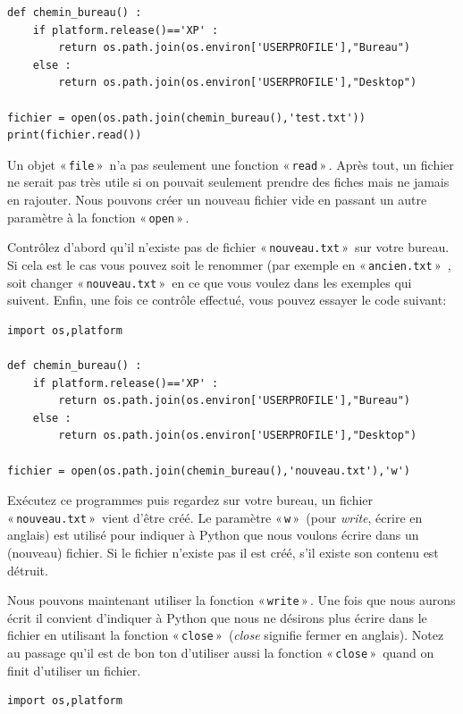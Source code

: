 \begin{MAC}
\begin{Verbatim}[frame=single,rulecolor=\color{gray}, label=ne pas saisir]
def chemin_bureau() :
    if platform.release()=='XP' :
        return os.path.join(os.environ['USERPROFILE'],"Bureau")
    else :
        return os.path.join(os.environ['USERPROFILE'],"Desktop")
    
fichier = open(os.path.join(chemin_bureau(),'test.txt'))
print(fichier.read())
\end{Verbatim}

Un objet « \texttt{file} »  n'a pas seulement une fonction « \texttt{read} » . Après tout, un fichier ne serait pas très utile si on pouvait seulement prendre des fiches mais ne jamais en rajouter. Nous pouvons créer un nouveau fichier vide en passant un autre paramètre à la fonction « \texttt{open} » .

Contrôlez d'abord qu'il n'existe pas de fichier « \texttt{nouveau.txt} »  sur votre bureau. Si cela est le cas vous pouvez soit le renommer (par exemple en « \texttt{ancien.txt} »  , soit changer « \texttt{nouveau.txt} »  en ce que vous voulez dans les exemples qui suivent. Enfin, une fois ce contrôle effectué, vous pouvez essayer le code suivant:

\begin{Verbatim}[frame=single,rulecolor=\color{mbleu}, label=à taper par exemple en reprenant l'existant]
import os,platform

def chemin_bureau() :
    if platform.release()=='XP' :
        return os.path.join(os.environ['USERPROFILE'],"Bureau")
    else :
        return os.path.join(os.environ['USERPROFILE'],"Desktop")
    
fichier = open(os.path.join(chemin_bureau(),'nouveau.txt'),'w')
\end{Verbatim}

Exécutez ce programmes puis regardez sur votre bureau, un fichier « \texttt{nouveau.txt} »  vient d'être créé. Le paramètre « \texttt{w} »  (pour \emph{write}, écrire en anglais) est utilisé pour indiquer à Python que nous voulons écrire dans un (nouveau) fichier. Si le fichier n'existe pas il est créé, s'il existe son contenu est détruit.

Nous pouvons maintenant utiliser la fonction « \texttt{write} » . Une fois que nous aurons écrit il convient d'indiquer à Python que nous ne désirons plus écrire dans le fichier en utilisant la fonction « \texttt{close} »  (\emph{close} signifie fermer en anglais). Notez au passage qu'il est de bon ton d'utiliser aussi la fonction « \texttt{close} »  quand on finit d'utiliser un fichier.
 
\begin{Verbatim}[frame=single,rulecolor=\color{mbleu}, label=à taper par exemple en reprenant l'existant]
import os,platform


\end{Verbatim}
\end{MAC}
